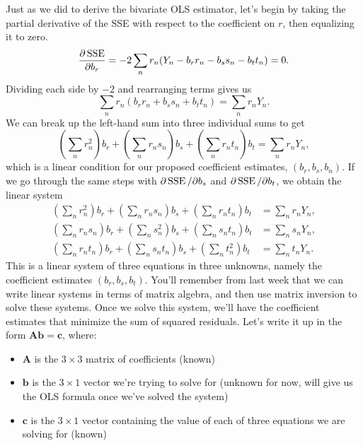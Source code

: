 \documentclass[
  12pt,
  oneside,openany]{book}
\providecommand{\tightlist}{%
  \setlength{\itemsep}{0pt}\setlength{\parskip}{0pt}}
\begin{document}
Just as we did to derive the bivariate OLS estimator, let's begin by taking the partial derivative of the SSE with respect to the coefficient on \(r\), then equalizing it to zero.
\[
\frac{\partial \mathop{\rm SSE}\nolimits}{\partial b_r}
= -2 \sum_n r_n (Y_n - b_r r_n - b_s s_n - b_t t_n)
= 0.
\]
Dividing each side by \(-2\) and rearranging terms gives us
\[
\sum_n r_n (b_r r_n + b_s s_n + b_t t_n) = \sum_n r_n Y_n.
\]
We can break up the left-hand sum into three individual sums to get
\[
\left( \sum_n r_n^2 \right) b_r + \left( \sum_n r_n s_n \right) b_s + \left( \sum_n r_n t_n \right) b_t = \sum_n r_n Y_n,
\]
which is a linear condition for our proposed coefficient estimates, \((b_r, b_s, b_n)\).
If we go through the same steps with \(\partial \mathop{\rm SSE}\nolimits/ \partial b_s\) and \(\partial \mathop{\rm SSE}\nolimits/ \partial b_t\), we obtain the linear system
\[
\begin{aligned}
\left( \sum_n r_n^2 \right) b_r + \left( \sum_n r_n s_n \right) b_s + \left( \sum_n r_n t_n \right) b_t &= \sum_n r_n Y_n, \\
\left( \sum_n r_n s_n \right) b_r + \left( \sum_n s_n^2 \right) b_s + \left( \sum_n s_n t_n \right) b_t &= \sum_n s_n Y_n, \\
\left( \sum_n r_n t_n \right) b_r + \left( \sum_n s_n t_n \right) b_s + \left( \sum_n t_n^2 \right) b_t &= \sum_n t_n Y_n.
\end{aligned}
\]
This is a linear system of three equations in three unknowns, namely the coefficient estimates \((b_r, b_s, b_t)\).
You'll remember from last week that we can write linear systems in terms of matrix algebra, and then use matrix inversion to solve these systems.
Once we solve this system, we'll have the coefficient estimates that minimize the sum of squared residuals.
Let's write it up in the form \(\mathbf{A} \mathbf{b} = \mathbf{c}\), where:

\begin{itemize}
\tightlist
\item
  \(\mathbf{A}\) is the \(3 \times 3\) matrix of coefficients (known)
\item
  \(\mathbf{b}\) is the \(3 \times 1\) vector we're trying to solve for (unknown for now, will give us the OLS formula once we've solved the system)
\item
  \(\mathbf{c}\) is the \(3 \times 1\) vector containing the value of each of three equations we are solving for (known)
\end{itemize}
\end{document}
